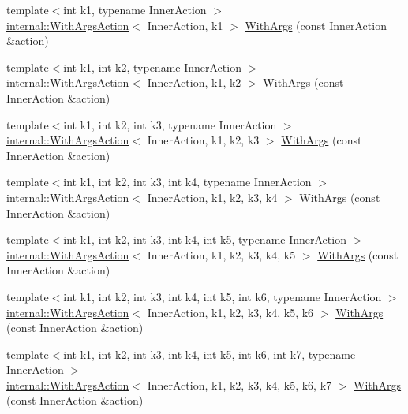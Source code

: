 \begin{DoxyCompactItemize}
\item 
{\footnotesize template$<$int k1, typename Inner\+Action $>$ }\\\mbox{\hyperlink{structtesting_1_1internal_1_1_with_args_action}{internal\+::\+With\+Args\+Action}}$<$ Inner\+Action, k1 $>$ \mbox{\hyperlink{namespacetesting_a3bd9eef13bee9065b19d3cd571829c7c}{With\+Args}} (const Inner\+Action \&action)
\item 
{\footnotesize template$<$int k1, int k2, typename Inner\+Action $>$ }\\\mbox{\hyperlink{structtesting_1_1internal_1_1_with_args_action}{internal\+::\+With\+Args\+Action}}$<$ Inner\+Action, k1, k2 $>$ \mbox{\hyperlink{namespacetesting_aa82fc09250ba172220e6fb7e77249e74}{With\+Args}} (const Inner\+Action \&action)
\item 
{\footnotesize template$<$int k1, int k2, int k3, typename Inner\+Action $>$ }\\\mbox{\hyperlink{structtesting_1_1internal_1_1_with_args_action}{internal\+::\+With\+Args\+Action}}$<$ Inner\+Action, k1, k2, k3 $>$ \mbox{\hyperlink{namespacetesting_a999614cb785165b9a44a9a95a3753407}{With\+Args}} (const Inner\+Action \&action)
\item 
{\footnotesize template$<$int k1, int k2, int k3, int k4, typename Inner\+Action $>$ }\\\mbox{\hyperlink{structtesting_1_1internal_1_1_with_args_action}{internal\+::\+With\+Args\+Action}}$<$ Inner\+Action, k1, k2, k3, k4 $>$ \mbox{\hyperlink{namespacetesting_a646a2e4ac7866ee8c486cb167ba9b45e}{With\+Args}} (const Inner\+Action \&action)
\item 
{\footnotesize template$<$int k1, int k2, int k3, int k4, int k5, typename Inner\+Action $>$ }\\\mbox{\hyperlink{structtesting_1_1internal_1_1_with_args_action}{internal\+::\+With\+Args\+Action}}$<$ Inner\+Action, k1, k2, k3, k4, k5 $>$ \mbox{\hyperlink{namespacetesting_aa36b0c7216df96bdacf9fe491afd40bd}{With\+Args}} (const Inner\+Action \&action)
\item 
{\footnotesize template$<$int k1, int k2, int k3, int k4, int k5, int k6, typename Inner\+Action $>$ }\\\mbox{\hyperlink{structtesting_1_1internal_1_1_with_args_action}{internal\+::\+With\+Args\+Action}}$<$ Inner\+Action, k1, k2, k3, k4, k5, k6 $>$ \mbox{\hyperlink{namespacetesting_a6df9cd27659e5943b5d3d77fc4f102e3}{With\+Args}} (const Inner\+Action \&action)
\item 
{\footnotesize template$<$int k1, int k2, int k3, int k4, int k5, int k6, int k7, typename Inner\+Action $>$ }\\\mbox{\hyperlink{structtesting_1_1internal_1_1_with_args_action}{internal\+::\+With\+Args\+Action}}$<$ Inner\+Action, k1, k2, k3, k4, k5, k6, k7 $>$ \mbox{\hyperlink{namespacetesting_a04146a27847141c6942e9c67a85aadbe}{With\+Args}} (const Inner\+Action \&action)

\end{DoxyCompactItemize}
